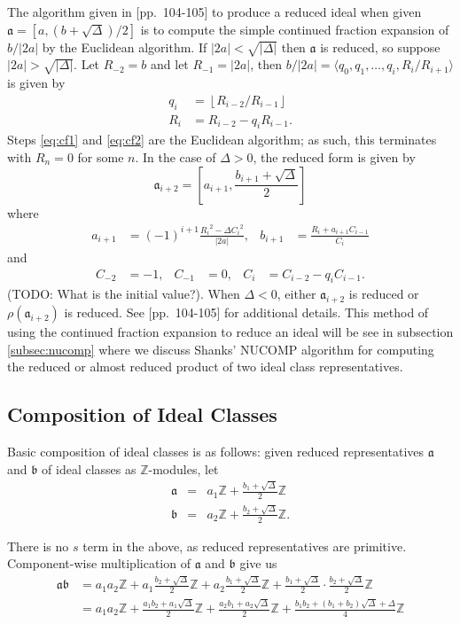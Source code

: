 \documentclass{ucalgthes1}
\theoremstyle{plain}
\theoremstyle{definition}
\newcommand{\ZZ}{\mathbb{Z}}
\newcommand{\floor}[1]{\left\lfloor #1 \right\rfloor}
\begin{document}
The algorithm given in \cite{Jac09}[pp.~104-105] to produce a reduced ideal when given $\mathfrak a = [a, (b+\sqrt\Delta)/2]$ is to compute the simple continued fraction expansion of $b/|2a|$ by the Euclidean algorithm.  If $|2a| < \sqrt{|\Delta|}$ then $\mathfrak a$ is reduced, so suppose $|2a| > \sqrt{|\Delta|}$.  Let $R_{-2}=b$ and let $R_{-1}=|2a|$, then $b/|2a| = \langle q_0, q_1, \dots, q_i, R_i/R_{i+1} \rangle$ is given by
\begin{align}
	q_i &= \floor{ R_{i-2}/R_{i-1} } \label{eq:cf1} \\
	R_i &= R_{i-2} - q_i R_{i-1}. \label{eq:cf2}
\end{align}
Steps \eqref{eq:cf1} and \eqref{eq:cf2} are the Euclidean algorithm; as such, this terminates with $R_n = 0$ for some $n$.  In the case of $\Delta>0$, the reduced form is given by
\[
	{\mathfrak a}_{i+2} = \left[ a_{i+1}, \frac{b_{i+1} + \sqrt\Delta}{2} \right]
\]
where
\begin{align*}
	a_{i+1} &= (-1)^{i+1} \frac{ {R_i}^2 -\Delta{C_i}^2 }{|2a|}, &
	b_{i+1} &= \frac{R_i + a_{i+1}C_{i-1}}{C_i}
\end{align*}
and
\begin{align*}
	C_{-2} &= -1, & 
	C_{-1} &= 0, &
	C_i &= C_{i-2} - q_i C_{i-1}.
\end{align*}
(TODO: What is the initial value?).  When $\Delta<0$, either ${\mathfrak a}_{i+2}$ is reduced or $\rho({\mathfrak a}_{i+2})$ is reduced.  See \cite{Jac09}[pp.~104-105] for additional details.  This method of using the continued fraction expansion to reduce an ideal will be see in subsection \ref{subsec:nucomp} where we discuss Shanks' NUCOMP algorithm for computing the reduced or almost reduced product of two ideal class representatives.


\subsection{Composition of Ideal Classes}
Basic composition of ideal classes is as follows: given reduced representatives $\mathfrak{a}$ and $\mathfrak{b}$ of ideal classes as $\ZZ$-modules, let
\begin{eqnarray*}
	\mathfrak{a} & = & a_1 \ZZ + \frac{b_1 + \sqrt{\Delta}}{2} \ZZ \\
	\mathfrak{b} & = & a_2 \ZZ + \frac{b_2 + \sqrt{\Delta}}{2} \ZZ.
\end{eqnarray*}

\noindent
There is no $s$ term in the above, as reduced representatives are primitive.  Component-wise multiplication of $\mathfrak a$ and $\mathfrak b$ give us
\begin{equation}
\begin{split}
	\mathfrak{a} \mathfrak{b} & = a_1a_2 \ZZ + a_1 \frac{b_2 + \sqrt{\Delta}}{2} \ZZ + a_2 \frac{b_1 + \sqrt{\Delta}}{2} \ZZ + \frac{b_1 + \sqrt{\Delta}}{2} \cdot \frac{b_2 + \sqrt{\Delta}}{2} \ZZ \\
	& = a_1a_2 \ZZ + \frac{a_1b_2 + a_1\sqrt{\Delta}}{2} \ZZ + \frac{a_2b_1 + a_2\sqrt{\Delta}}{2} \ZZ + \frac{b_1b_2 + (b_1+b_2)\sqrt{\Delta} + \Delta}{4} \ZZ \label{eq:composeExpanded}
\end{split}
\end{equation}
\end{document}
